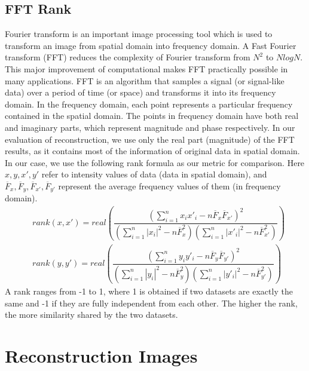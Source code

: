 \documentclass[12pt]{report} %
\begin{document}
\subsection{FFT Rank}
Fourier transform\cite{FT} is an important image processing tool which is used to transform an image from spatial domain into frequency domain. A Fast Fourier transform (FFT)\cite{FFT} reduces the complexity of Fourier transform from $N^2$ to $NlogN$. This major improvement of computational makes FFT practically possible in many applications. FFT is an algorithm that samples a signal (or signal-like data) over a period of time (or space) and transforms it into its frequency domain. In the frequency domain, each point represents a particular frequency contained in the spatial domain. The points in frequency domain have both real and imaginary parts, which represent magnitude and phase respectively. In our evaluation of reconstruction, we use only the real part (magnitude) of the FFT results, as it contains most of the information of original data in spatial domain. \\
In our case, we use the following rank formula as our metric for comparison. Here $x,y,x',y'$ refer to intensity values of data (data in spatial domain), and $\overline F_x,\overline F_y,\overline F_{x'},\overline F_{y'}$ represent the average frequency values of them (in frequency domain)\cite{ISA}.
\begin{equation}
\begin{split}
&rank(x,x')=real(\dfrac{(\sum_{i=1}^{n} x_{i}x'_{i}-n\overline F_{x} \overline F_{x'})^2}{(\sum_{i=1}^{n} |x_i|^2-n\overline F_{x}^2)(\sum_{i=1}^{n} |x'_i|^2-n\overline F_{x'}^2)}) \\
&rank(y,y')=real(\dfrac{(\sum_{i=1}^{n} y_{i}y'_{i}-n\overline F_{y} \overline F_{y'})^2}{(\sum_{i=1}^{n} |y_i|^2-n\overline F_{y}^2)(\sum_{i=1}^{n} |y'_i|^2-n\overline F_{y'}^2)})
\end{split}
\end{equation}
A rank ranges from -1 to 1, where 1 is obtained if two datasets are exactly the same and -1 if they are fully independent from each other. The higher the rank, the more similarity shared by the two datasets.

\section{Reconstruction Images}
\end{document}
